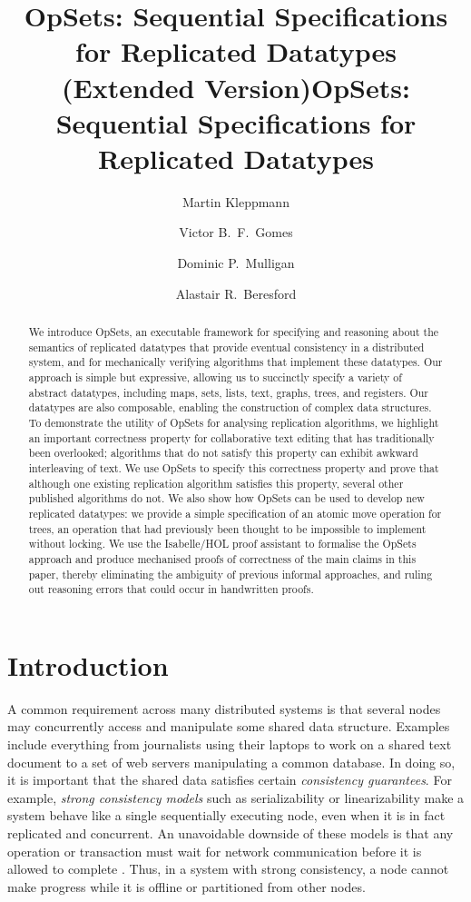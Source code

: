 \documentclass[a4paper,english]{lipics-v2018}
\title{OpSets: Sequential Specifications for Replicated Datatypes (Extended Version)}
\title{OpSets: Sequential Specifications for Replicated Datatypes}
\author{Martin Kleppmann}{Computer Laboratory, University of Cambridge, UK}{mk428@cl.cam.ac.uk}{https://orcid.org/0000-0001-7252-6958}{}
\author{Victor B.\ F.\ Gomes}{Computer Laboratory, University of Cambridge, UK}{vb358@cl.cam.ac.uk}{https://orcid.org/0000-0002-2954-4648}{}
\author{Dominic P.\ Mulligan}{Security Research Group, Arm Research, Cambridge, UK}{Dominic.Mulligan@arm.com}{https://orcid.org/0000-0003-4643-3541}{}
\author{Alastair R.\ Beresford}{Computer Laboratory, University of Cambridge, UK}{arb33@cl.cam.ac.uk}{https://orcid.org/0000-0003-0818-6535}{}
\begin{document}
\maketitle

\begin{abstract}
We introduce OpSets, an executable framework for specifying and reasoning about the semantics of replicated datatypes that provide eventual consistency in a distributed system, and for mechanically verifying algorithms that implement these datatypes.
Our approach is simple but expressive, allowing us to succinctly specify a variety of abstract datatypes, including maps, sets, lists, text, graphs, trees, and registers.
Our datatypes are also composable, enabling the construction of complex data structures.
To demonstrate the utility of OpSets for analysing replication algorithms, we highlight an important correctness property for collaborative text editing that has traditionally been overlooked; algorithms that do not satisfy this property can exhibit awkward interleaving of text.
We use OpSets to specify this correctness property and prove that although one existing replication algorithm satisfies this property, several other published algorithms do not.
We also show how OpSets can be used to develop new replicated datatypes: we provide a simple specification of an atomic move operation for trees, an operation that had previously been thought to be impossible to implement without locking.
We use the Isabelle/HOL proof assistant to formalise the OpSets approach and produce mechanised proofs of correctness of the main claims in this paper, thereby eliminating the ambiguity of previous informal approaches, and ruling out reasoning errors that could occur in handwritten proofs.
\end{abstract}
\clearpage

\section{Introduction}

A common requirement across many distributed systems is that several nodes may concurrently access and manipulate some shared data structure.
Examples include everything from journalists using their laptops to work on a shared text document to a set of web servers manipulating a common database.
In doing so, it is important that the shared data satisfies certain \emph{consistency guarantees}.
For example, \emph{strong consistency models} such as serializability \cite{Kleppmann:2017wj} or linearizability \cite{Herlihy:1990jq} make a system behave like a single sequentially executing node, even when it is in fact replicated and concurrent.
An unavoidable downside of these models is that any operation or transaction must wait for network communication before it is allowed to complete \cite{Davidson:1985hv,Gilbert:2002il}.
Thus, in a system with strong consistency, a node cannot make progress while it is offline or partitioned from other nodes.
\end{document}
